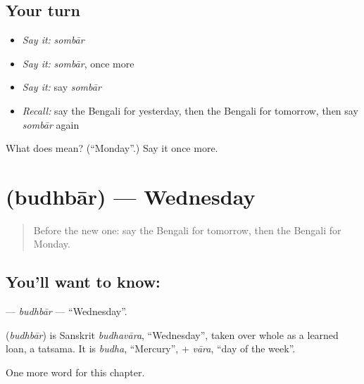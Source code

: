 \subsection*{Your turn}
\begin{itemize}
\raggedright
  \item \emph{Say it:} \emph{sombār}
  \item \emph{Say it:} \emph{sombār}, once more
  \item \emph{Say it:} say \emph{sombār}
  \item \emph{Recall:} say the Bengali for yesterday, then the Bengali for tomorrow, then say \emph{sombār} again
\end{itemize}

\begin{tcolorbox}[breakable,colback=teal!4,colframe=teal!35!black,title={Before you move on}]
What does  mean? (\textquotedblleft{}Monday\textquotedblright{}.) Say it once more.
\end{tcolorbox}
\section[\texorpdfstring{\bn{বুধবার} (budhbār)}{বুধবার (budhbār)}]{ (budhbār) — Wednesday}

\label{lesson:BN-C91-budhbar}



\begin{quote}
Before the new one: say the Bengali for tomorrow, then the Bengali for Monday.
\end{quote}

\subsection*{You'll want to know: }
\textbf{} — \emph{budhbār} — \textquotedblleft{}Wednesday\textquotedblright{}.

\begin{cousinweb}
\textbf{} (\emph{budhbār}) is Sanskrit \emph{budhavāra}, \textquotedblleft{}Wednesday\textquotedblright{}, taken over whole as a learned loan, a tatsama. It is \emph{budha}, \textquotedblleft{}Mercury\textquotedblright{}, + \emph{vāra}, \textquotedblleft{}day of the week\textquotedblright{}.
\end{cousinweb}

\begin{grammarlens}[title={What you've built}]
One more word for this chapter.
\end{grammarlens}

